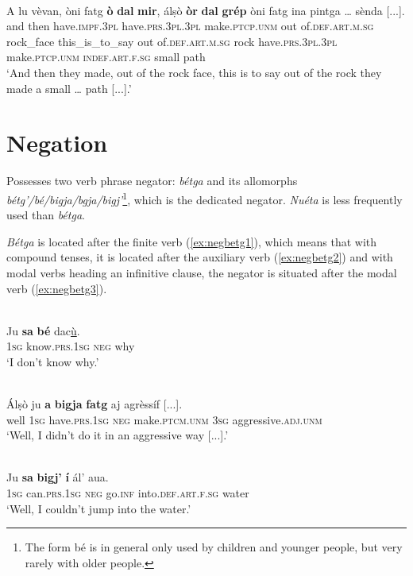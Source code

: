 \ea
\label{ex:instr:orda}
\\
\gll  A lu vèvan, òni fatg \textbf{ò} \textbf{dal} \textbf{mir}, álṣò \textbf{òr} \textbf{dal} \textbf{grép} òni fatg ina pintga …  sènda [...].\\
and then have.\textsc{impf.3pl} have.\textsc{prs.3pl.3pl} make.\textsc{ptcp.unm} out of.\textsc{def.art.m.sg} rock\_face this\_is\_to\_say out of.\textsc{def.art.m.sg} rock have.\textsc{prs.3pl.3pl} make.\textsc{ptcp.unm} \textsc{indef.art.f.sg} small {} path\\
\glt `And then they made, out of the rock face, this is to say out of the rock they made a small … path [...].'
\z 


\section{Negation}
Possesses two verb phrase negator: \textit{bétga} and its allomorphs  \textit{bétg'/bé/bigja/bgja/bigj'}\footnote{The form bé is in general only used by children and younger people, but very rarely with older people.}, which is the dedicated negator. \textit{Nuéta} is less frequently used than \textit{bétga}.

\textit{Bétga} is located after the finite verb (\ref{ex:negbetg1}), which means that with compound tenses, it is located after the auxiliary verb (\ref{ex:negbetg2}) and with modal verbs heading an infinitive clause, the negator is situated after the modal verb (\ref{ex:negbetg3}). 

\ea
\label{ex:negbetg1}
\\
\gll Ju \textbf{sa} \textbf{bé} dac\underline{ù}.\\
\textsc{1sg} know.\textsc{prs.1sg} \textsc{neg} why \\
\glt `I don’t know why.'
\z

\ea
\label{ex:negbetg2}
\\
\gll  Álṣò ju \textbf{a} \textbf{bigja} \textbf{fatg} aj agrèssíf [...]. \\
well \textsc{1sg} have.\textsc{prs.1sg} \textsc{neg} make.\textsc{ptcm.unm} \textsc{3sg} aggressive.\textsc{adj.unm}\\
\glt `Well, I didn’t do it in an aggressive way [...].'
\z

\ea\label{ex:negbetg3}
\\
\gll  Ju \textbf{sa} \textbf{bigj’} \textbf{í} ál’ aua.\\
\textsc{1sg} can.\textsc{prs.1sg} \textsc{neg} go.\textsc{inf} into.\textsc{def.art.f.sg} water \\
\glt `Well, I couldn’t jump into the water.'
\z

